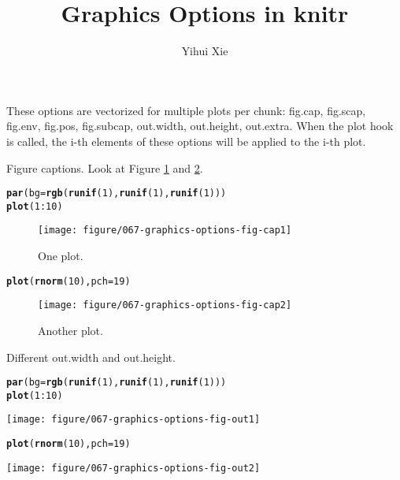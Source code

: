\documentclass{article}\usepackage[]{graphicx}\usepackage[]{color}
\title{Graphics Options in knitr}
\author{Yihui Xie}
\makeatletter
\newcommand{\hlfunctioncall}[1]{\textcolor[rgb]{0.501960784313725,0,0.329411764705882}{\textbf{#1}}}%
\newenvironment{kframe}{%
 \def\at@end@of@kframe{}%
 \ifinner\ifhmode%
  \def\at@end@of@kframe{\end{minipage}}%
  \begin{minipage}{\columnwidth}%
 \fi\fi%
 \def\FrameCommand##1{\hskip\@totalleftmargin \hskip-\fboxsep
 \colorbox{shadecolor}{##1}\hskip-\fboxsep
     \hskip-\linewidth \hskip-\@totalleftmargin \hskip\columnwidth}%
 \MakeFramed {\advance\hsize-\width
   \@totalleftmargin\z@ \linewidth\hsize
   \@setminipage}}%
 {\par\unskip\endMakeFramed%
 \at@end@of@kframe}
\newenvironment{knitrout}{}{} %
\makeatother
\begin{document}
\maketitle




These options are vectorized for multiple plots per chunk: fig.cap, fig.scap, fig.env, fig.pos, fig.subcap, out.width, out.height, out.extra. When the plot hook is called, the i-th elements of these options will be applied to the i-th plot.

Figure captions. Look at Figure \ref{fig:fig-cap1} and \ref{fig:fig-cap2}.

\begin{knitrout}
\color{fgcolor}\begin{kframe}
\begin{alltt}
\hlfunctioncall{par}(bg = \hlfunctioncall{rgb}(\hlfunctioncall{runif}(1), \hlfunctioncall{runif}(1), \hlfunctioncall{runif}(1)))
\hlfunctioncall{plot}(1:10)
\end{alltt}
\end{kframe}\begin{figure}[H]

\texttt{[image: figure/067-graphics-options-fig-cap1]} \caption[One plot]{One plot.\label{fig:fig-cap1}}
\end{figure}

\begin{kframe}\begin{alltt}
\hlfunctioncall{plot}(\hlfunctioncall{rnorm}(10), pch = 19)
\end{alltt}
\end{kframe}\begin{figure}[H]

\texttt{[image: figure/067-graphics-options-fig-cap2]} \caption[Another plot]{Another plot.\label{fig:fig-cap2}}
\end{figure}


\end{knitrout}


Different out.width and out.height.

\begin{knitrout}
\color{fgcolor}\begin{kframe}
\begin{alltt}
\hlfunctioncall{par}(bg = \hlfunctioncall{rgb}(\hlfunctioncall{runif}(1), \hlfunctioncall{runif}(1), \hlfunctioncall{runif}(1)))
\hlfunctioncall{plot}(1:10)
\end{alltt}
\end{kframe}
\texttt{[image: figure/067-graphics-options-fig-out1]} 
\begin{kframe}\begin{alltt}
\hlfunctioncall{plot}(\hlfunctioncall{rnorm}(10), pch = 19)
\end{alltt}
\end{kframe}
\texttt{[image: figure/067-graphics-options-fig-out2]} 

\end{knitrout}
\end{document}
